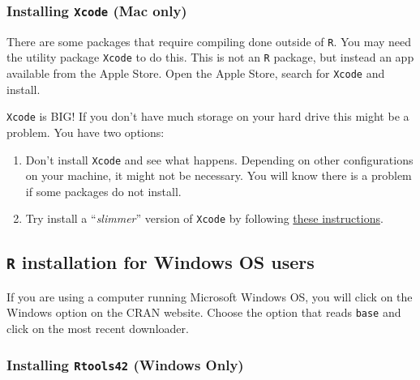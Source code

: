 \documentclass[
]{book}
\providecommand{\tightlist}{%
  \setlength{\itemsep}{0pt}\setlength{\parskip}{0pt}}
\newenvironment{rmdcaution}[1]
  {
  \begin{itemize}
  \renewcommand{\labelitemi}{
    \raisebox{-.7\height}[0pt][0pt]{
      {\setkeys{Gin}{width=3em,keepaspectratio}\texttt{[image: images/\#1]}}
    }
  }
  \setlength{\fboxsep}{1em}
  \begin{caution}
  \item
  }
  {
  \end{caution}
  \end{itemize}
  }
\begin{document}
\hypertarget{installing-xcode-mac-only}{%
\subsubsection{\texorpdfstring{Installing \texttt{Xcode} (Mac only)}{Installing Xcode (Mac only)}}\label{installing-xcode-mac-only}}

There are some packages that require compiling done outside of \texttt{R}. You may need the utility package \texttt{Xcode} to do this. This is not an \texttt{R} package, but instead an app available from the Apple Store. Open the Apple Store, search for \texttt{Xcode} and install.

\begin{rmdcaution}{caution}

\texttt{Xcode} is BIG! If you don't have much storage on your hard drive this might be a problem. You have two options:

\begin{enumerate}
\def\labelenumi{\arabic{enumi}.}
\tightlist
\item
  Don't install \texttt{Xcode} and see what happens. Depending on other configurations on your machine, it might not be necessary. You will know there is a problem if some packages do not install.
\item
  Try install a ``\emph{slimmer}'' version of \texttt{Xcode} by following \href{https://mac.install.guide/commandlinetools/index.html}{these instructions}.
\end{enumerate}

\end{rmdcaution}

\hypertarget{r-installation-for-windows-os-users}{%
\subsection{\texorpdfstring{\texttt{R} installation for Windows OS users}{R installation for Windows OS users}}\label{r-installation-for-windows-os-users}}

If you are using a computer running Microsoft Windows OS, you will click on the Windows option on the CRAN website. Choose the option that reads \texttt{base} and click on the most recent downloader.

\hypertarget{installing-rtools42-windows-only}{%
\subsubsection{\texorpdfstring{Installing \texttt{Rtools42} (Windows Only)}{Installing Rtools42 (Windows Only)}}\label{installing-rtools42-windows-only}}
\end{document}
